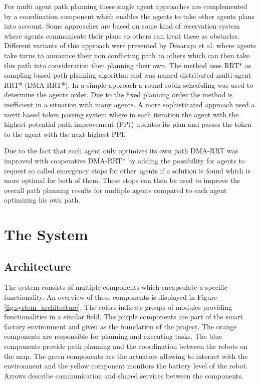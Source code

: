 \documentclass[journal]{IEEEtran}
\begin{document}
For multi agent path planning these single agent approaches are complemented by a coordination component which enables the agents to take other agents plans into account. Some approaches are based on some kind of reservation system where agents communicate their plans so others can treat these as obstacles. Different variants of this approach were presented by Desaraju et al.\cite{DMA} where agents take turns to announce their non conflicting path to others which can then take this path into consideration then planning their own. The method uses  RRT* as sampling based path planning algorithm and was named distributed multi-agent RRT* (DMA-RRT*). In a simple approach a round robin scheduling was used to determine the agents order. Due to the fixed planning order the method is inefficient in a situation with many agents. A more sophisticated approach used a merit based token passing system where in each iteration the agent with the highest potential path improvement (PPI) updates its plan and passes the token to the agent with the next highest PPI.

Due to the fact that each agent only optimizes its own path DMA-RRT was improved with cooperative DMA-RRT*\cite{DMA} by adding the possibility for agents to request so called emergency stops for other agents if a solution is found which is more optimal for both of them. These stops can then be used to improve the overall path planning results for multiple agents compared to each agent optimizing his own path.

\section{The System}
\label{sec:system}


\subsection{Architecture}
\label{subsec:architecture}
The system consists of multiple components which encapsulate a specific functionality. An overview of these components is displayed in Figure \ref{fig:system_architecture}. The colors indicate groups of modules providing functionalities in a similar field. The purple components are part of the smart factory environment and given as the foundation of the project. The orange components are responsible for planning and executing tasks. The blue components provide path planning and the coordination between the robots on the map. The green components are the actuators allowing to interact with the environment and the yellow component monitors the battery level of the robot. Arrows describe communication and shared services between the components.
\end{document}
